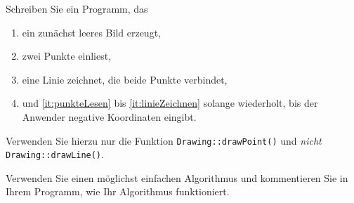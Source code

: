 %
Schreiben Sie ein Programm, das
%
\begin{enumerate}
  \item ein zunächst leeres Bild erzeugt,
  \item\label{it:punkteLesen} zwei Punkte einliest,
  \item\label{it:linieZeichnen} eine Linie zeichnet, die beide Punkte
        verbindet,
  \item und \ref{it:punkteLesen} bis \ref{it:linieZeichnen} solange
        wiederholt, bis der Anwender negative Koordinaten eingibt.
\end{enumerate}
%
Verwenden Sie hierzu nur die Funktion
\texttt{Drawing::drawPoint()} und \emph{nicht}
\texttt{Drawing::drawLine()}.

Verwenden Sie einen möglichst einfachen Algorithmus und kommentieren Sie
in Ihrem Programm, wie Ihr Algorithmus funktioniert.
